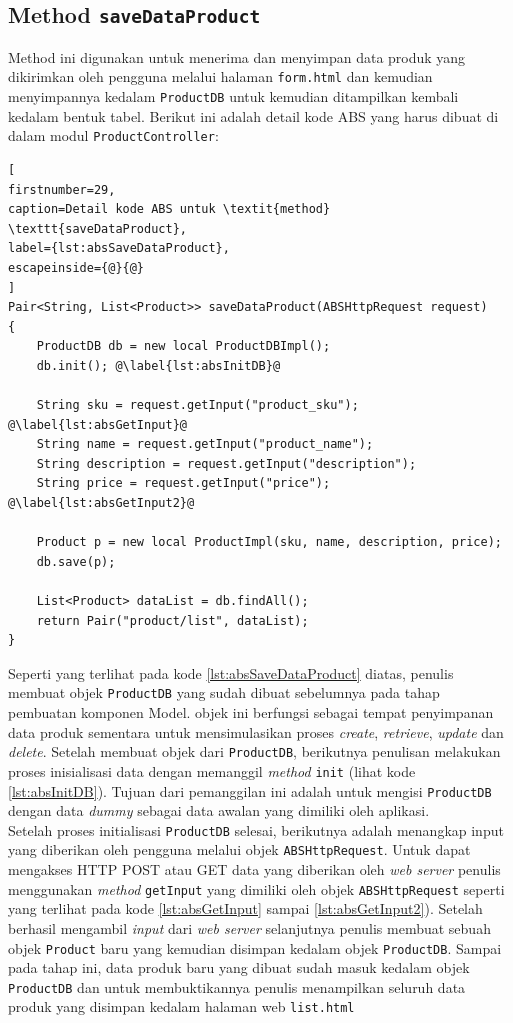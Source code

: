 \subsection{Method \texttt{saveDataProduct}}
Method ini digunakan untuk menerima dan menyimpan data produk yang dikirimkan oleh pengguna melalui halaman \texttt{form.html} dan kemudian menyimpannya kedalam \texttt{ProductDB} untuk kemudian ditampilkan kembali kedalam bentuk tabel. Berikut ini adalah detail kode ABS yang harus dibuat di dalam modul \texttt{ProductController}:

\begin{lstlisting}[
firstnumber=29,
caption=Detail kode ABS untuk \textit{method} \texttt{saveDataProduct},
label={lst:absSaveDataProduct},
escapeinside={@}{@}
]
Pair<String, List<Product>> saveDataProduct(ABSHttpRequest request)
{
	ProductDB db = new local ProductDBImpl();
	db.init(); @\label{lst:absInitDB}@
	
	String sku = request.getInput("product_sku"); @\label{lst:absGetInput}@
	String name = request.getInput("product_name");
	String description = request.getInput("description");
	String price = request.getInput("price"); @\label{lst:absGetInput2}@
	
	Product p = new local ProductImpl(sku, name, description, price);
	db.save(p);
	
	List<Product> dataList = db.findAll();
	return Pair("product/list", dataList);
}
\end{lstlisting}

Seperti yang terlihat pada kode \ref{lst:absSaveDataProduct} diatas, penulis membuat objek \texttt{ProductDB} yang sudah dibuat sebelumnya pada tahap pembuatan komponen Model. objek ini berfungsi sebagai tempat penyimpanan data produk sementara untuk mensimulasikan proses \textit{create}, \textit{retrieve}, \textit{update} dan \textit{delete}. Setelah membuat objek dari \texttt{ProductDB}, berikutnya penulisan melakukan proses inisialisasi data dengan memanggil \textit{method} \texttt{init} (lihat kode \ref{lst:absInitDB}). Tujuan dari pemanggilan ini adalah untuk mengisi \texttt{ProductDB} dengan data \textit{dummy} sebagai data awalan yang dimiliki oleh aplikasi.\\

Setelah proses initialisasi \texttt{ProductDB} selesai, berikutnya adalah menangkap input yang diberikan oleh pengguna melalui objek \texttt{ABSHttpRequest}. Untuk dapat mengakses HTTP POST atau GET data yang diberikan oleh \textit{web server} penulis menggunakan \textit{method} \texttt{getInput} yang dimiliki oleh objek \texttt{ABSHttpRequest} seperti yang terlihat pada kode \ref{lst:absGetInput} sampai \ref{lst:absGetInput2}). Setelah berhasil mengambil \textit{input} dari \textit{web server} selanjutnya penulis membuat sebuah objek \texttt{Product} baru yang kemudian disimpan kedalam objek \texttt{ProductDB}. Sampai pada tahap ini, data produk baru yang dibuat sudah masuk kedalam objek \texttt{ProductDB} dan untuk membuktikannya penulis menampilkan seluruh data produk yang disimpan kedalam halaman web \texttt{list.html}

